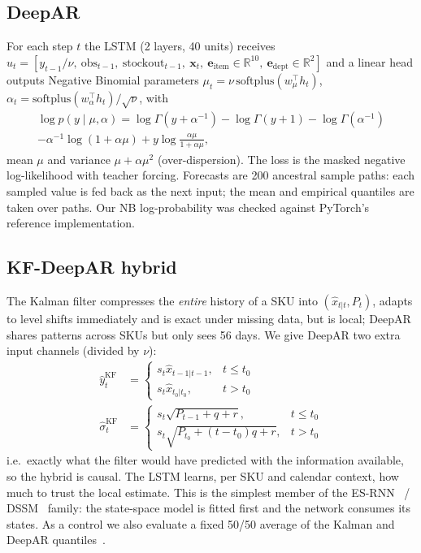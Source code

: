 \documentclass[conference]{IEEEtran}
\begin{document}
\subsection{DeepAR}
For each step $t$ the LSTM (2 layers, 40 units) receives $u_t=[y_{t-1}/\nu,\ \text{obs}_{t-1},\ \text{stockout}_{t-1},\ \mathbf x_t,\ \mathbf e_{\text{item}}\in\mathbb R^{10},\ \mathbf e_{\text{dept}}\in\mathbb R^{2}]$
and a linear head outputs Negative Binomial parameters
$\mu_t=\nu\,\mathrm{softplus}(w_\mu^\top h_t)$, $\alpha_t=\mathrm{softplus}(w_\alpha^\top h_t)/\sqrt\nu$, with
\begin{multline}
\log p(y\mid\mu,\alpha)=\log\Gamma(y+\alpha^{-1})-\log\Gamma(y+1)-\log\Gamma(\alpha^{-1})\\
-\alpha^{-1}\log(1+\alpha\mu)+y\log\frac{\alpha\mu}{1+\alpha\mu},
\end{multline}
mean $\mu$ and variance $\mu+\alpha\mu^2$ (over-dispersion). The loss is the masked negative log-likelihood with teacher forcing.
Forecasts are 200 ancestral sample paths: each sampled value is fed back as the next input; the mean and empirical quantiles are taken
over paths. Our NB log-probability was checked against PyTorch's reference implementation.

\subsection{KF-DeepAR hybrid}
The Kalman filter compresses the \emph{entire} history of a SKU into $(\hat x_{t|t},P_t)$, adapts to level shifts immediately and is
exact under missing data, but is local; DeepAR shares patterns across SKUs but only sees 56 days. We give DeepAR two extra input channels
(divided by $\nu$):
\begin{align}
\hat y^{\text{KF}}_t&=\begin{cases}s_t\hat x_{t-1|t-1}, & t\le t_0\\ s_t\hat x_{t_0|t_0}, & t>t_0\end{cases}\\
\hat\sigma^{\text{KF}}_t&=\begin{cases}s_t\sqrt{P_{t-1}+q+r}, & t\le t_0\\ s_t\sqrt{P_{t_0}+(t-t_0)q+r}, & t>t_0\end{cases}
\end{align}
i.e.\ exactly what the filter would have predicted with the information available, so the hybrid is causal. The LSTM learns, per SKU and
calendar context, how much to trust the local estimate. This is the simplest member of the ES-RNN~\cite{smyl2020esrnn} /
DSSM~\cite{rangapuram2018dssm} family: the state-space model is fitted first and the network consumes its states. As a control we also
evaluate a fixed 50/50 average of the Kalman and DeepAR quantiles~\cite{bates1969combination}.
\end{document}

